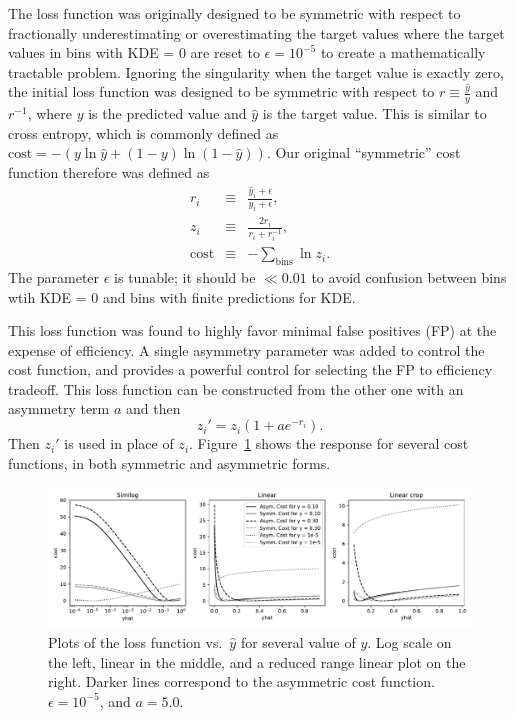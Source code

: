 \documentclass[10pt, paper=a4, UKenglish]{article}
\begin{document}
The loss function was originally designed to be symmetric with respect to fractionally underestimating or overestimating the target values where the target values in bins with KDE = 0 are reset to $ \epsilon = 10^{-5} $ to create a mathematically tractable problem.  Ignoring the singularity when the target value is exactly zero, the initial loss function was designed to be symmetric with respect to  $r \equiv \frac{\hat y}{y}$ and $r^{-1}$, where $y$ is the predicted value and $\hat y$ is the target value. This is similar to cross entropy, which is commonly defined as
%
$
\mathrm{cost} = - \left(
y \ln \hat y + (1-y) \ln (1 - \hat y)
\right)
$.
%
Our original ``symmetric'' cost function therefore was defined as
\begin{eqnarray}
r_i & \equiv & \frac{\hat y_i + \epsilon}{y_i + \epsilon}, \\
z_i & \equiv & \frac{2 r_i}{r_i + r_i^{-1}}, \\
\mathrm{cost}  & \equiv &- \sum_\mathrm{bins} \ln z_i.
\end{eqnarray}
%
The parameter $ \epsilon $ is tunable; it should be $ \ll 0.01 $ to avoid confusion between bins wtih KDE = 0 and bins with finite predictions for KDE.

This loss function was found to highly favor minimal false positives (FP) at the expense of efficiency. A single asymmetry parameter was added to control the cost function, and provides a powerful control for selecting the FP to efficiency tradeoff. This loss function can be constructed from the other one with an asymmetry term $a$ and then
\begin{equation}
z_i' = z_i \left(
1+a e^{-r_i}
\right).
\end{equation}
Then $z_i'$ is used in place of $z_i$.
Figure~\ref{fig:loss} shows the response for several cost functions, in both symmetric and asymmetric forms.


\begin{figure}[!htb]
	\centering
	\includegraphics[width=\textwidth]{images/LossPaper.pdf}
	\caption{Plots of the loss function vs.\ $\hat y$ for several value of $y$. Log scale on the left, linear in the middle, and a reduced range linear plot on the right. Darker lines correspond to the asymmetric cost function. $\epsilon=10^{-5}$, and $a=5.0$.}
	\label{fig:loss}
\end{figure}
\end{document}
